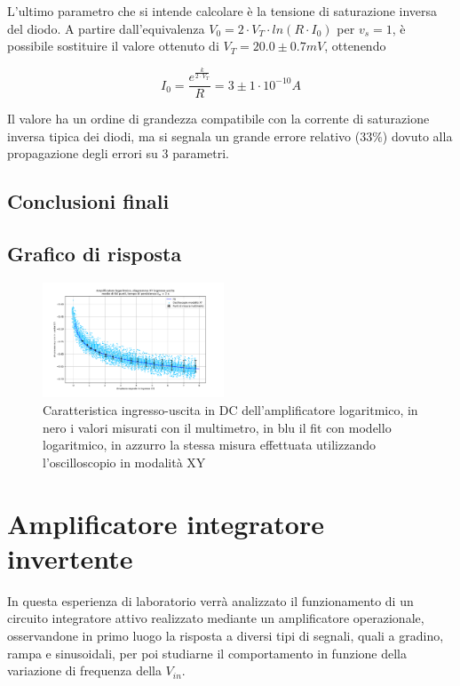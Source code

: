 \documentclass[journal]{IEEEtran}
\begin{document}
L'ultimo parametro che si intende calcolare è la tensione di saturazione inversa del diodo.
A partire dall'equivalenza $V_0 = 2 \cdot V_T \cdot ln(R \cdot I_0)$  per $v_s = 1$, è possibile sostituire il valore ottenuto di $V_T = 20.0 \pm 0.7 mV$, ottenendo

\[ I_0 = \frac{e^{\frac{k}{2 \cdot V_T}}}{R} = 3 \pm 1 \cdot 10^{-10} A \]

Il valore ha un ordine di grandezza compatibile con la corrente di saturazione inversa tipica dei diodi, ma si segnala un grande errore relativo ($33 \% $) dovuto alla propagazione degli errori su 3 parametri.

\subsection{Conclusioni finali}



\subsection{Grafico di risposta}

\begin{figure}[H]%
\begin {center}
\includegraphics[trim = {100px 0 0 0}, width=0.48\textwidth]{analysis/output/OPA-log-fitted.pdf}
\caption{Caratteristica ingresso-uscita in DC dell'amplificatore logaritmico, in nero i valori misurati con il multimetro, in blu il fit con modello logaritmico, in azzurro la stessa misura effettuata utilizzando l'oscilloscopio in modalità XY}
\label{fig:log_ampl_fit_xy}
\end {center}
\end{figure}


\section{\textbf{Amplificatore integratore invertente}} %
In questa esperienza di laboratorio verrà analizzato il funzionamento di un circuito integratore attivo realizzato mediante un amplificatore operazionale, osservandone in primo luogo la risposta a diversi tipi di segnali, quali a gradino, rampa e sinusoidali, per poi studiarne il comportamento in funzione della variazione di frequenza della $V_{in}$.
\end{document}
